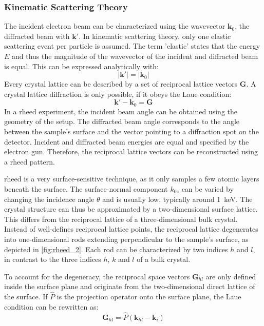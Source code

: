 \subsubsection{Kinematic Scattering Theory}
The incident electron beam can be characterized using the wavevector $\mathbf{k}_{0}$,
the diffracted beam with $\mathbf{k}'$.
In kinematic scattering theory, only one elastic scattering event per particle is 
assumed. 
The term 'elastic' states that the energy $E$ and thus the magnitude of the wavevector
of the incident and diffracted beam is equal.
This can be expressed analytically with:
\begin{equation}
	\lvert \mathbf{k}' \rvert=\lvert \mathbf{k}_{0} \rvert
\end{equation}
Every crystal lattice can be described by a set of reciprocal lattice vectors
$\mathbf{G}$. 
A crystal lattice diffraction is only possible, if it obeys the Laue condition:
\begin{equation}
\mathbf{k}'-\mathbf{k}_{0}=\mathbf{G}
\end{equation}
In a \ac{rheed} experiment, the incident beam angle can be obtained using the 
geometry of the setup.
The diffracted beam angle corresponds to the angle between the sample's surface  and the 
vector pointing to a diffraction spot on the detector. 
Incident and diffracted beam energies are equal and specified by the electron gun.
Therefore, the reciprocal lattice vectors can be reconstructed using a \ac{rheed} 
pattern. 

\ac{rheed} is a very surface-sensitive technique, as it only samples a few atomic layers 
beneath the surface.
The surface-normal component $k_{0z}$ can be varied by changing the incidence angle 
$\theta$ and is usually low, typically around \qty{1}{\kilo \electronvolt}.
The crystal structure can thus be approximated by a two-dimensional surface lattice.
This differs from the reciprocal lattice of a three-dimensional bulk crystal.
Instead of well-defines reciprocal lattice points, the reciprocal lattice degenerates 
into one-dimensional rods extending perpendicular to the sample's surface, as depicted 
in \cref{fig:rheed_2}.
Each rod can be characterized by two indices $h$ and $l$, in contrast to the three 
indices $h$, $k$ and $l$ of a bulk crystal.

To account for the degeneracy, the reciprocal space vectors $\mathbf{G}_{hl}$ are only 
defined inside the surface plane and originate from the two-dimensional direct lattice
of the surface. 
If $\hat{P}$ is the projection operator onto the surface plane, the Laue condition can 
be rewritten as:
\begin{equation}
	\mathbf{G}_{hl}=\hat{P}(\mathbf{k}_{hl}-\mathbf{k}_{i})
\end{equation}

